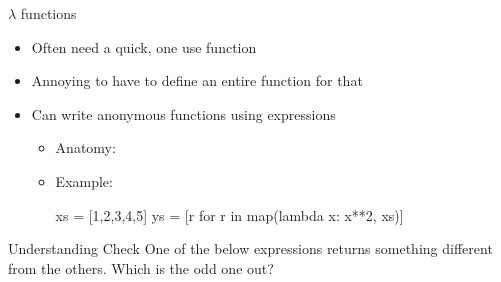 \documentclass[pdf, aspectratio=169, 12pt]{beamer}
\begin{document}


\begin{frame}[fragile]{$\lambda$ functions}
	\begin{itemize}
		\item Often need a quick, one use function
		\item Annoying to have to define an entire function for that
		\item Can write \alert{anonymous functions} using  expressions
			\begin{itemize}
				\item Anatomy: 
				\item Example:
					\begin{pythoncode}
						xs = [1,2,3,4,5]
						ys = [r for r in map(lambda x: x**2, xs)]
					\end{pythoncode}
			\end{itemize}
	\end{itemize}
\end{frame}

\begin{frame}{Understanding Check}
	One of the below expressions returns something different from the others. Which is the odd one out?
	\begin{poll}
	\item {}
	\item {}
	\item {}
	\item {}
	\end{poll}
\end{frame}
\end{document}
